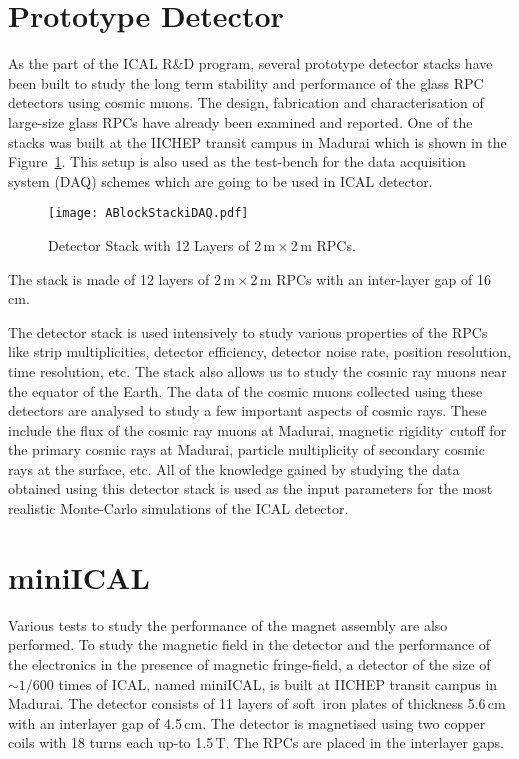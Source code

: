 \section{Prototype Detector}
As the part of the ICAL R\&D program, several prototype detector
stacks have been built to study the long term stability and
performance of the glass RPC detectors using cosmic muons. The design,
fabrication and characterisation of large-size glass RPCs have already
been examined and reported\cite{largerpc}. One of the stacks was built
at the IICHEP transit campus in Madurai which is shown in the
Figure~\ref{fig:ablock}. This setup is also used as the test-bench
for the data acquisition system (DAQ) schemes which are going to be
used in ICAL detector.
\begin{figure}[h]
  \centering
  \texttt{[image: ABlockStackiDAQ.pdf]}
  \caption{Detector Stack with 12 Layers of 2\,m\,$\times$\,2\,m RPCs.}
  \label{fig:ablock}
\end{figure}
The stack is made of 12 layers of 2\,m\,$\times$\,2\,m RPCs with an
inter-layer gap of 16\,cm.

The detector stack is used intensively to study various properties of
the RPCs like strip multiplicities, detector efficiency, detector
noise rate, position resolution, time resolution, etc. The stack also
allows us to study the cosmic ray muons near the equator of the Earth.
The data of the cosmic muons collected using these detectors are
analysed to study a few important aspects of cosmic rays. These
include the flux of the cosmic ray muons at Madurai\cite{pethu1},
magnetic rigidity~cutoff for the primary cosmic rays at Madurai,
particle multiplicity of secondary cosmic rays at the surface, etc.
All of the knowledge gained
by studying the data obtained using this detector stack is used as the
input parameters for the most realistic Monte-Carlo simulations of the
ICAL detector.

\section{miniICAL}
Various tests to study the performance of the magnet assembly are also
performed. To study the magnetic field in the detector and the
performance of the electronics in the presence of magnetic
fringe-field, a detector of the size of $\sim 1/600$ times of ICAL,
named miniICAL, is built at IICHEP transit campus in Madurai. The
detector consists of 11 layers of soft~iron plates of thickness
5.6\,cm with an interlayer gap of 4.5\,cm. The detector is magnetised
using two copper coils with 18 turns each up-to 1.5\,T. The RPCs are
placed in the interlayer gaps.

